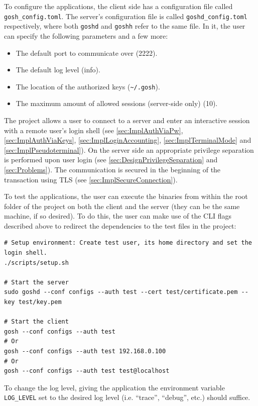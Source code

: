 \documentclass[10pt,a4paper,titlepage,twoside,english,final]{zhawreprt}
\begin{document}
To configure the applications, the client side has a configuration file called \texttt{gosh\_config.toml}.
The server's configuration file is called \texttt{goshd\_config.toml} respectively, where both \texttt{goshd} and \texttt{goshh} refer to the same file.
In it, the user can specify the following parameters and a few more:
\begin{itemize}
\item The default port to communicate over (2222).
\item The default log level (info).
\item The location of the authorized keys (\texttt{\textasciitilde{}/.gosh}).
\item The maximum amount of allowed sessions (server-side only) (10).
\end{itemize}

The project allows a user to connect to a server and enter an interactive session with a remote user's \gls{login} \gls{shell} (see \ref{sec:ImplAuthViaPw}, \ref{sec:ImplAuthViaKeys}, \ref{sec:ImplLoginAccounting}, \ref{sec:ImplTerminalMode} and \ref{sec:ImplPseudoterminal}).
On the server side an appropriate privilege separation is performed upon user \gls{login} (see \ref{sec:DesignPrivilegeSeparation} and \ref{sec:Problems}).
The communication is secured in the beginning of the transaction using \gls{TLS} (see \ref{sec:ImplSecureConnection}).

To test the applications, the user can execute the binaries from within the root folder of the project on both the client and the server (they can be the same machine, if so desired).
To do this, the user can make use of the \gls{CLI} flags described above to redirect the dependencies to the test files in the project:
\setlistingBash
\begin{lstlisting}[caption={Running the applications for test purposes},label=lst:RunProject,deletekeywords={test}]
# Setup environment: Create test user, its home directory and set the login shell.
./scripts/setup.sh

# Start the server
sudo goshd --conf configs --auth test --cert test/certificate.pem --key test/key.pem

# Start the client
gosh --conf configs --auth test
# Or
gosh --conf configs --auth test 192.168.0.100
# Or
gosh --conf configs --auth test test@localhost
\end{lstlisting}

To change the log level, giving the application the environment variable \texttt{LOG\_LEVEL} set to the desired log level (i.e. ``trace'', ``debug'', etc.) should suffice.
\end{document}
